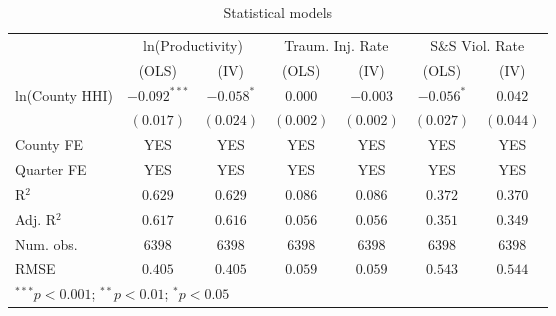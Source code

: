 
\begin{table}
\begin{center}
\begin{tabular}{l c c c c c c}
\hline
 & \multicolumn{2}{c}{ ln(Productivity) } & \multicolumn{2}{c}{ Traum. Inj. Rate } & \multicolumn{2}{c}{ S\&S Viol. Rate } \\
\cline{2-3} \cline{4-5} \cline{6-7}
 & (OLS) & (IV) & (OLS) & (IV) & (OLS) & (IV) \\
\hline
ln(County HHI) & $-0.092^{***}$ & $-0.058^{*}$ & $0.000$   & $-0.003$  & $-0.056^{*}$ & $0.042$   \\
               & $(0.017)$      & $(0.024)$    & $(0.002)$ & $(0.002)$ & $(0.027)$    & $(0.044)$ \\
\hline
County FE      & YES            & YES          & YES       & YES       & YES          & YES       \\
Quarter FE     & YES            & YES          & YES       & YES       & YES          & YES       \\
R$^2$          & $0.629$        & $0.629$      & $0.086$   & $0.086$   & $0.372$      & $0.370$   \\
Adj. R$^2$     & $0.617$        & $0.616$      & $0.056$   & $0.056$   & $0.351$      & $0.349$   \\
Num. obs.      & $6398$         & $6398$       & $6398$    & $6398$    & $6398$       & $6398$    \\
RMSE           & $0.405$        & $0.405$      & $0.059$   & $0.059$   & $0.543$      & $0.544$   \\
\hline
\multicolumn{7}{l}{\scriptsize{$^{***}p<0.001$; $^{**}p<0.01$; $^{*}p<0.05$}}
\end{tabular}
\caption{Statistical models}
\label{table:coefficients}
\end{center}
\end{table}

